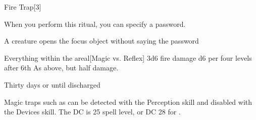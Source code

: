 \begin{spellsection}{Fire Trap}[3]
    \begin{spellheader}
    \end{spellheader}
    \begin{spellcontent}
        \begin{spelltargetinginfo}
        \end{spelltargetinginfo}
        \begin{spelleffects}

            \spellspecial When you perform this ritual, you can specify a password.
            \spellline
            \begin{spelltrigger}{A creature opens the focus object without saying the password}
                \begin{spelltargets}{Everything within the area}l[Magic vs. Reflex]
                    \spellsuccess 3d6 fire damage \add d6 per four levels after 6th
                    \spellfailure As above, but half damage.
                \end{spelltargets}
            \end{spelltrigger}
            \spelldur Thirty days or until discharged \dismissable
        \end{spelleffects}
    \end{spellcontent}
    \begin{spellfooter}
        \spellnotes \firespellnotes

        \par Magic traps such as  can be detected with the Perception skill and disabled with the Devices skill. The DC is 25 \add spell level, or DC 28 for .
    \end{spellfooter}
\end{spellsection}

